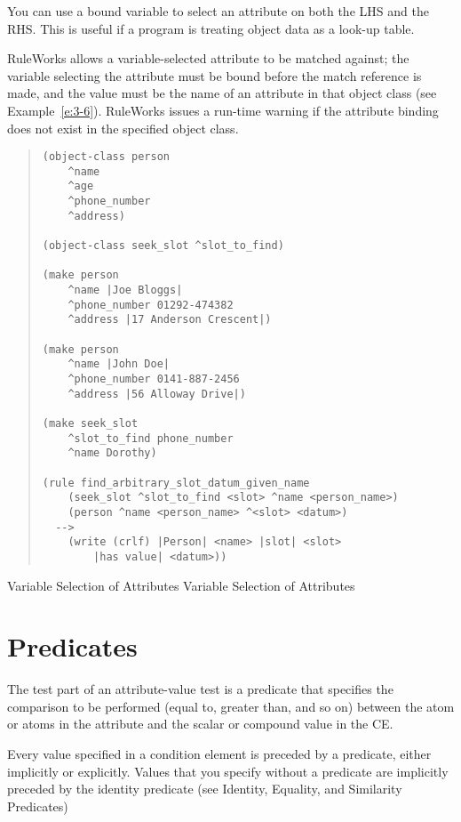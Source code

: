 You can use a bound variable to select an attribute on both the LHS
and the RHS. This is useful if a program is treating object data as a
look-up table.

RuleWorks allows a variable-selected attribute to be matched against;
the variable selecting the attribute must be bound before the match
reference is made, and the value must be the name of an attribute in
that object class (see Example~\ref{e:3-6}). RuleWorks issues a run-time
warning if the attribute binding does not exist in the specified
object class.

\begin{example}[h]
\begin{quote}
\begin{verbatim}
(object-class person
    ^name
    ^age
    ^phone_number
    ^address)

(object-class seek_slot ^slot_to_find)

(make person
    ^name |Joe Bloggs|
    ^phone_number 01292-474382
    ^address |17 Anderson Crescent|)

(make person
    ^name |John Doe|
    ^phone_number 0141-887-2456
    ^address |56 Alloway Drive|)

(make seek_slot
    ^slot_to_find phone_number
    ^name Dorothy)

(rule find_arbitrary_slot_datum_given_name
    (seek_slot ^slot_to_find <slot> ^name <person_name>)
    (person ^name <person_name> ^<slot> <datum>)
  -->
    (write (crlf) |Person| <name> |slot| <slot> 
        |has value| <datum>))
\end{verbatim}
\end{quote}
\caption{Variable Selection of Attributes Variable Selection of Attributes}
\label{e:3-6}
\end{example}

\section{Predicates}

The test part of an attribute-value test is a predicate that specifies
the comparison to be performed (equal to, greater than, and so on)
between the atom or atoms in the attribute and the scalar or compound
value in the CE.

Every value specified in a condition element is preceded by a
predicate, either implicitly or explicitly. Values that you specify
without a predicate are implicitly preceded by the identity predicate
(see Identity, Equality, and Similarity Predicates)

